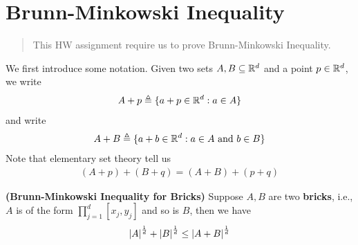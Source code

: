 \documentclass{report}
\begin{document}
\section{Brunn-Minkowski Inequality}
\begin{abstract}
This HW assignment require us to prove Brunn-Minkowski Inequality.   
\end{abstract}
\begin{mdframed}
We first introduce some notation. Given two sets $A,B\subseteq \mathbb{R}^d$ and a point $p\in\mathbb{R}^d$, we write 
\begin{align*}
A+p\triangleq \{ a+p\in\mathbb{R}^d: a \in A \}
\end{align*}
and write 
\begin{align*}
A+B \triangleq \{ a+b \in\mathbb{R}^d: a\in A\text{ and }b \in  B \}
\end{align*}
Note that elementary set theory tell us 
\begin{align}
\label{trans}
  (A+p)+(B+q)=(A+B)+(p+q)
\end{align}

\end{mdframed}
\begin{theorem}
\label{Brunn-Minkowski Inequality for Bricks}
\textbf{(Brunn-Minkowski Inequality for Bricks)} Suppose $A,B$ are two  \textbf{bricks}, i.e., $A$ is of the form $\prod_{j=1}^d[x_j,y_j]$ and so is $B$, then we have 
\begin{align*}
\left|A\right|^{\frac{1}{d}}+ \left|B\right|^{\frac{1}{d}}\leq \left|A+B\right|^{\frac{1}{d}}
\end{align*}
\end{theorem}
\end{document}
